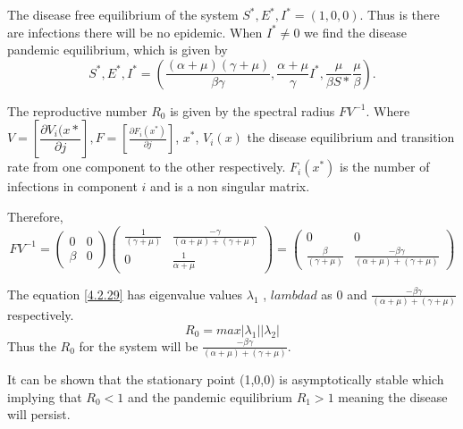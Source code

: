 The disease free equilibrium of the system $S^*, E^*, I^* = (1,0,0)$.
Thus is there are infections there will be no epidemic. When $I^* \neq 0$ we find the disease pandemic equilibrium, which is given by
\begin{equation*}
S^*, E^*, I^*  = \left(\frac{(\alpha + \mu)(\gamma + \mu)}{\beta \gamma} , \frac{\alpha + \mu }{ \gamma} I^*, \frac{\mu}{\beta S*} \frac{\mu}{\beta} \right).
\end{equation*}

The reproductive number $R_0$ is given by the spectral radius $FV^{-1}$.  Where  
$ V = \left[\dfrac{\partial V_i(x*}{\partial j} \right],  F = \left[ \frac{\partial F_i (x^*)}{\partial j}\right]$,  $x^*$, $V_i (x)$  the disease equilibrium and transition rate from one component to the other respectively. $F_i(x^*)$ is the  number of infections in component $i$ and is a non singular matrix.

Therefore,
\begin{equation}\label{4.2.29}
FV^{-1} = \left(\begin{array}{cc} 
0&0 \\ \beta&0
\end{array} \right) \left(\begin{array}{cc}
\frac{1}{(\gamma + \mu)}&  \frac{-\gamma}{(\alpha +\mu)+ (\gamma + \mu)}\\ 0& \frac{1}{\alpha + \mu}  

\end{array} \right) = \left(\begin{array}{cc} 0&0 \\
\frac{\beta}{(\gamma + \mu)} &\frac{- \beta\gamma}{(\alpha +\mu)+ (\gamma + \mu)} 
\end{array}\right)
\end{equation}

The equation \ref{4.2.29} has eigenvalue values $\lambda_1$ , $lambdad$ as 0 and $\frac{- \beta\gamma}{(\alpha +\mu)+ (\gamma + \mu)}$ respectively.
 \begin{equation}
 R_0 = max {|\lambda_1| |\lambda_2|}
 \end{equation}
Thus the $R_0$ for the system will be $\frac{- \beta\gamma}{(\alpha +\mu)+ (\gamma + \mu)}$.

It can be shown that the stationary point (1,0,0) is asymptotically stable which implying that $R_0 <1$ and the pandemic  equilibrium $R_1 >1$ meaning the disease will persist.

